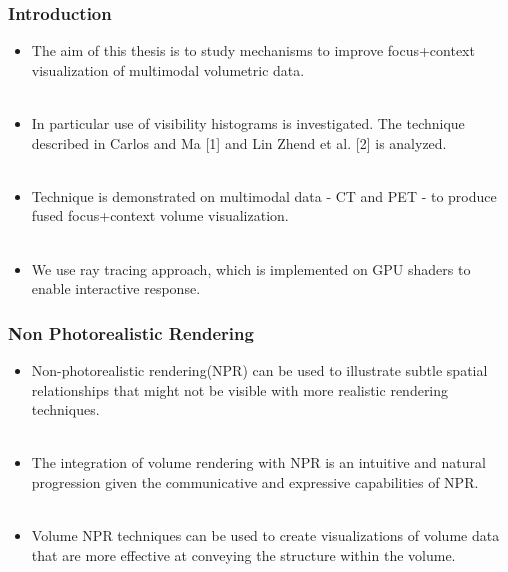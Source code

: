\documentclass{beamer}
\begin{document}
\begin{frame}
\frametitle{Introduction}
\begin{itemize}
\item The aim of this thesis is to study mechanisms to improve focus+context visualization of multimodal volumetric data. \\ $ $
\item In particular use of visibility histograms is investigated. The technique described in Carlos and Ma [1] and Lin Zhend et al. [2] is analyzed. \\ $ $
\item Technique is demonstrated on multimodal data - CT and PET - to produce fused focus+context volume visualization. \\ $ $
\item We use ray tracing approach, which is implemented on GPU shaders to enable interactive response.

\end{itemize}
\end{frame}


\begin{frame}
\frametitle{Non Photorealistic Rendering}
\begin{itemize}
\item Non-photorealistic rendering(NPR) can be used to illustrate subtle spatial relationships that might not be visible with more realistic rendering techniques. \\ $ $
\item The integration of volume rendering with NPR is an intuitive and natural progression given the communicative and expressive capabilities of NPR. \\ $ $
\item Volume NPR techniques can be used to create visualizations of volume data that are more effective at conveying the structure within the volume. \\ $ $
\end{itemize}
\end{frame}

\end{document}
